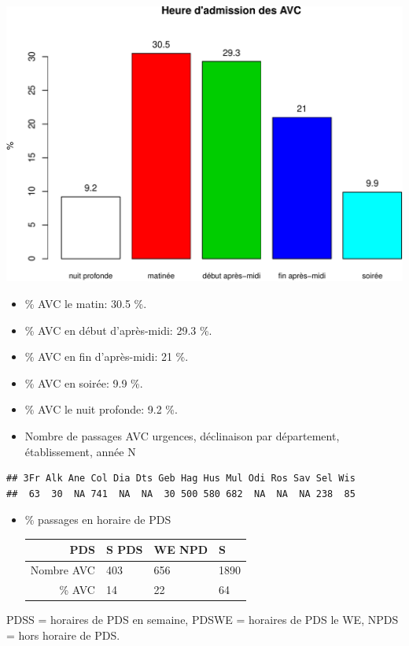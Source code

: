 \documentclass[]{article}
\begin{document}
\includegraphics{rapport2014_V4_files/figure-latex/avc_periode-1.pdf}

\begin{itemize}
\item
  \% AVC le matin: 30.5 \%.
\item
  \% AVC en début d'après-midi: 29.3 \%.
\item
  \% AVC en fin d'après-midi: 21 \%.
\item
  \% AVC en soirée: 9.9 \%.
\item
  \% AVC le nuit profonde: 9.2 \%.
\item
  Nombre de passages AVC urgences, déclinaison par département,
  établissement, année N
\end{itemize}

\begin{verbatim}
## 3Fr Alk Ane Col Dia Dts Geb Hag Hus Mul Odi Ros Sav Sel Wis 
##  63  30  NA 741  NA  NA  30 500 580 682  NA  NA  NA 238  85
\end{verbatim}

\begin{itemize}
\item
  \% passages en horaire de PDS

  \begin{longtable}[c]{@{}rlll@{}}
  \toprule
  PDS & S PDS & WE NPD & S\tabularnewline
  \midrule
  \endhead
  Nombre AVC & 403 & 656 & 1890\tabularnewline
  \% AVC & 14 & 22 & 64\tabularnewline
  \bottomrule
  \end{longtable}
\end{itemize}

PDSS = horaires de PDS en semaine, PDSWE = horaires de PDS le WE, NPDS =
hors horaire de PDS.
\end{document}
